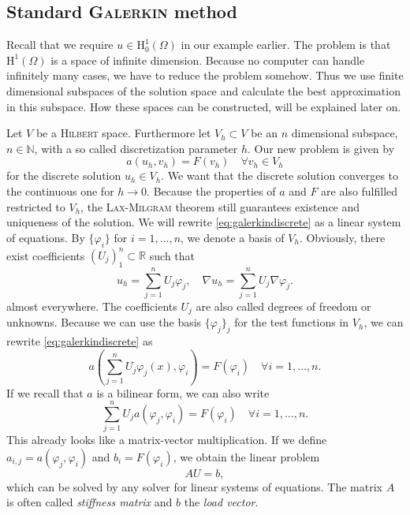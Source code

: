 \documentclass[12pt,a4paper,twoside, open=right]{scrreprt}
\theoremstyle{definition}
\theoremstyle{plain}
\newcommand{\rr}{\mathbb{R}}
\newcommand{\nn}{\mathbb{N}}
\begin{document}
\subsection{Standard \textsc{Galerkin} method}
 Recall that we require $u\in \mathrm{H}^1_0(\Omega)$ in our example earlier. The problem is that $\mathrm{H}^1(\Omega)$ is a space of infinite dimension. Because no computer can handle infinitely many cases, we have to reduce the problem somehow. Thus we use finite dimensional subspaces of the solution space and calculate the best approximation in this subspace. How these spaces can be constructed, will be explained later on. 
\par 
Let $V$ be a \textsc{Hilbert} space. Furthermore let $V_h\subset V$ be an $n$ dimensional subspace, $n\in\nn$, with a so called discretization parameter $h$.
Our new problem is given by
\begin{equation}
a(u_h,v_h) = F(v_h) \quad \forall v_h\in V_h \label{eq:galerkindiscrete}
\end{equation}
for the discrete solution $u_h\in V_h$. We want that the discrete solution converges to the continuous one for $h\to 0$. Because the properties of $a$ and $F$ are also fulfilled restricted to $V_h$, the \textsc{Lax-Milgram} theorem still guarantees existence and uniqueness of the solution. 
We will rewrite \eqref{eq:galerkindiscrete} as a linear system of equations. By $\{\varphi_i\}$ for $i=1,\dotsc,n$, we denote a basis of $V_h$. Obviously, there exist coefficients $(U_j)_1^n\subset\rr$ such that
\begin{equation}
    u_h=\sum_{j=1}^{n}U_j\varphi_j,\quad \nabla u_h=\sum_{j=1}^{n}U_j\nabla\varphi_j.
\end{equation}
almost everywhere. The coefficients $U_j$ are also called degrees of freedom or unknowns. Because we can use the basis $\{\varphi_j\}_j$ for the test functions in $V_h$, we can rewrite \eqref{eq:galerkindiscrete} as 
\begin{equation}
    a\left(\sum_{j=1}^{n}U_j\varphi_j(x),\varphi_i\right)= F(\varphi_i)\quad \forall i=1,\dotsc,n.
\end{equation}
If we recall that $a$ is a bilinear form, we can also write
\begin{equation}
    \sum_{j=1}^{n}U_ja(\varphi_j,\varphi_i)=F(\varphi_i) \quad\forall i=1,\dotsc,n.
\end{equation}
This already looks like a matrix-vector multiplication. If we define $a_{i,j}=a(\varphi_j,\varphi_i)$ and $b_i=F(\varphi_i)$, we obtain the linear problem
\begin{equation}
    AU=b,
\end{equation} which can be solved by any solver for linear systems of equations. The matrix $A$ is often called \emph{stiffness matrix} and $b$ the \emph{load vector}.
\end{document}
